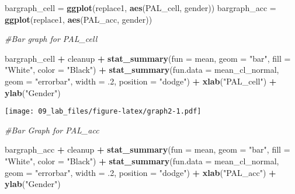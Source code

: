 \documentclass[
]{article}
\newenvironment{Shaded}{\begin{snugshade}}{\end{snugshade}}
\newcommand{\CommentTok}[1]{\textcolor[rgb]{0.56,0.35,0.01}{\textit{#1}}}
\newcommand{\DataTypeTok}[1]{\textcolor[rgb]{0.13,0.29,0.53}{#1}}
\newcommand{\FloatTok}[1]{\textcolor[rgb]{0.00,0.00,0.81}{#1}}
\newcommand{\KeywordTok}[1]{\textcolor[rgb]{0.13,0.29,0.53}{\textbf{#1}}}
\newcommand{\NormalTok}[1]{#1}
\newcommand{\OperatorTok}[1]{\textcolor[rgb]{0.81,0.36,0.00}{\textbf{#1}}}
\newcommand{\StringTok}[1]{\textcolor[rgb]{0.31,0.60,0.02}{#1}}
\begin{document}
\begin{Shaded}
\begin{Highlighting}[]
\NormalTok{bargraph_cell =}\StringTok{ }\KeywordTok{ggplot}\NormalTok{(replace1, }\KeywordTok{aes}\NormalTok{(PAL_cell, gender))}
\NormalTok{bargraph_acc =}\StringTok{ }\KeywordTok{ggplot}\NormalTok{(replace1, }\KeywordTok{aes}\NormalTok{(PAL_acc, gender))}

\CommentTok{#Bar graph for PAL_cell}

\NormalTok{bargraph_cell }\OperatorTok{+}
\StringTok{  }\NormalTok{cleanup }\OperatorTok{+}
\StringTok{  }\KeywordTok{stat_summary}\NormalTok{(}\DataTypeTok{fun =}\NormalTok{ mean, }
               \DataTypeTok{geom =} \StringTok{"bar"}\NormalTok{, }
               \DataTypeTok{fill =} \StringTok{"White"}\NormalTok{, }
               \DataTypeTok{color =} \StringTok{"Black"}\NormalTok{) }\OperatorTok{+}
\StringTok{  }\KeywordTok{stat_summary}\NormalTok{(}\DataTypeTok{fun.data =}\NormalTok{ mean_cl_normal, }
               \DataTypeTok{geom =} \StringTok{"errorbar"}\NormalTok{, }
               \DataTypeTok{width =} \FloatTok{.2}\NormalTok{, }
               \DataTypeTok{position =} \StringTok{"dodge"}\NormalTok{) }\OperatorTok{+}
\StringTok{   }\KeywordTok{xlab}\NormalTok{(}\StringTok{"PAL_cell"}\NormalTok{) }\OperatorTok{+}
\StringTok{  }\KeywordTok{ylab}\NormalTok{(}\StringTok{"Gender"}\NormalTok{)}
\end{Highlighting}
\end{Shaded}

\texttt{[image: 09\_lab\_files/figure-latex/graph2-1.pdf]}

\begin{Shaded}
\begin{Highlighting}[]
\CommentTok{#Bar Graph for PAL_acc}

\NormalTok{bargraph_acc }\OperatorTok{+}
\StringTok{  }\NormalTok{cleanup }\OperatorTok{+}
\StringTok{  }\KeywordTok{stat_summary}\NormalTok{(}\DataTypeTok{fun =}\NormalTok{ mean, }
               \DataTypeTok{geom =} \StringTok{"bar"}\NormalTok{, }
               \DataTypeTok{fill =} \StringTok{"White"}\NormalTok{, }
               \DataTypeTok{color =} \StringTok{"Black"}\NormalTok{) }\OperatorTok{+}
\StringTok{  }\KeywordTok{stat_summary}\NormalTok{(}\DataTypeTok{fun.data =}\NormalTok{ mean_cl_normal, }
               \DataTypeTok{geom =} \StringTok{"errorbar"}\NormalTok{, }
               \DataTypeTok{width =} \FloatTok{.2}\NormalTok{, }
               \DataTypeTok{position =} \StringTok{"dodge"}\NormalTok{) }\OperatorTok{+}
\StringTok{   }\KeywordTok{xlab}\NormalTok{(}\StringTok{"PAL_acc"}\NormalTok{) }\OperatorTok{+}
\StringTok{  }\KeywordTok{ylab}\NormalTok{(}\StringTok{"Gender"}\NormalTok{)}
\end{Highlighting}
\end{Shaded}
\end{document}
